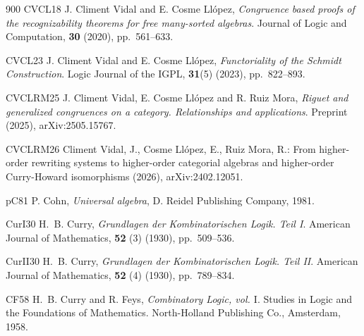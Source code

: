 \begin{thebibliography}{900}
\bibitem%
{CVCL18} J. Climent Vidal and E. Cosme Ll\'{o}pez, \emph{Congruence based proofs of the recognizability theorems for free many-sorted algebras}. Journal of Logic and Computation, \textbf{30} (2020), pp.~561--633.

\bibitem%
{CVCL23} J. Climent Vidal and E. Cosme Ll\'{o}pez, \emph{Functoriality of the Schmidt Construction}. Logic Journal of the IGPL, \textbf{31}(5) (2023), pp.~822--893.

\bibitem%
{CVCLRM25} J. Climent Vidal, E. Cosme Ll\'{o}pez and R. Ruiz Mora, \emph{Riguet and generalized congruences on a category. Relationships and applications}. Preprint (2025), arXiv:2505.15767.

\bibitem%
{CVCLRM26}
Climent Vidal, J., Cosme Llópez, E., Ruiz Mora, R.: From higher-order rewriting systems to higher-order categorial algebras and higher-order Curry-Howard isomorphisms (2026), arXiv:2402.12051.


\bibitem%
{pC81} P. Cohn, \emph{Universal algebra}, D. Reidel Publishing Company, 1981.


\bibitem%
{CurI30} H.~B. Curry, \emph{Grundlagen der Kombinatorischen Logik. Teil I}. American Journal of Mathematics, \textbf{52} (3) (1930), pp.~509--536.

\bibitem%
{CurII30} H.~B. Curry, \emph{Grundlagen der Kombinatorischen Logik. Teil II}. American Journal of Mathematics, \textbf{52} (4) (1930), pp.~789--834.

\bibitem%
{CF58} H.~B. Curry and R. Feys, \emph{Combinatory Logic, vol. $\mathrm{I}$}. Studies in Logic and the Foundations of Mathematics. North-Holland Publishing Co., Amsterdam, 1958.



\end{thebibliography}
